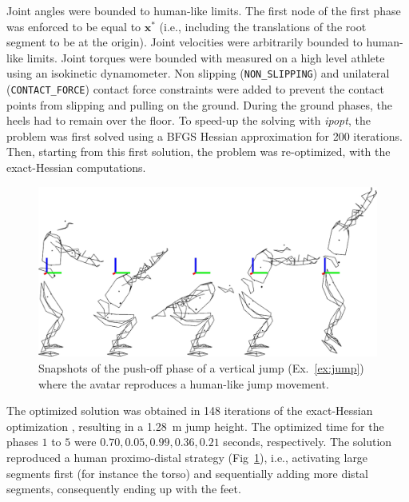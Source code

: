 Joint angles were bounded to human-like limits.
The first node of the first phase was enforced to be equal to $\mathbf{x^*}$ (i.e., including the translations of the root segment to be at the origin). 
Joint velocities were arbitrarily bounded to human-like limits.
Joint torques were bounded with  measured on a high level athlete using an isokinetic dynamometer. 
Non slipping (\texttt{NON\_SLIPPING}) and unilateral (\texttt{CONTACT\_FORCE}) contact force constraints were added to prevent the contact points from slipping and pulling on the ground.
During the ground phases, the heels had to remain over the floor.
To speed-up the solving with \emph{ipopt}, the problem was first solved using a BFGS Hessian approximation for 200 iterations.
Then, starting from this first solution, the problem was re-optimized, with the exact-Hessian computations.

\begin{figure}[t!]
  \includegraphics[width=\columnwidth]{figures/kinogramme_jump}
  \caption{Snapshots of the push-off phase of a vertical jump (Ex.~\ref{ex:jump}) where the avatar reproduces a human-like jump movement.} 
  \label{fig:jump}
\end{figure}

The optimized solution was obtained in 148 iterations of the exact-Hessian optimization , resulting in a \SI{1.28}{\meter} jump height.
The optimized time for the phases $1$ to $5$ were $0.70, 0.05, 0.99, 0.36, 0.21$ seconds, respectively.
The solution reproduced a human proximo-distal strategy (Fig~\ref{fig:jump}), i.e., activating large segments first (for instance the torso) and sequentially adding more distal segments, consequently ending up with the feet.
